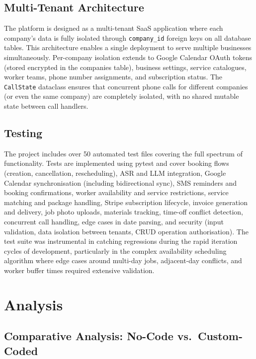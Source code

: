 \documentclass[conference]{IEEEtran}
\begin{document}
\subsection{Multi-Tenant Architecture}

The platform is designed as a multi-tenant SaaS application where each company's data is fully isolated through \texttt{company\_id} foreign keys on all database tables. This architecture enables a single deployment to serve multiple businesses simultaneously. Per-company isolation extends to Google Calendar OAuth tokens (stored encrypted in the companies table), business settings, service catalogues, worker teams, phone number assignments, and subscription status. The \texttt{CallState} dataclass ensures that concurrent phone calls for different companies (or even the same company) are completely isolated, with no shared mutable state between call handlers.


\subsection{Testing}

The project includes over 50 automated test files covering the full spectrum of functionality. Tests are implemented using pytest and cover booking flows (creation, cancellation, rescheduling), ASR and LLM integration, Google Calendar synchronisation (including bidirectional sync), SMS reminders and booking confirmations, worker availability and service restrictions, service matching and package handling, Stripe subscription lifecycle, invoice generation and delivery, job photo uploads, materials tracking, time-off conflict detection, concurrent call handling, edge cases in date parsing, and security (input validation, data isolation between tenants, CRUD operation authorisation). The test suite was instrumental in catching regressions during the rapid iteration cycles of development, particularly in the complex availability scheduling algorithm where edge cases around multi-day jobs, adjacent-day conflicts, and worker buffer times required extensive validation.

\section{Analysis}

\subsection{Comparative Analysis: No-Code vs.\ Custom-Coded}
\end{document}
